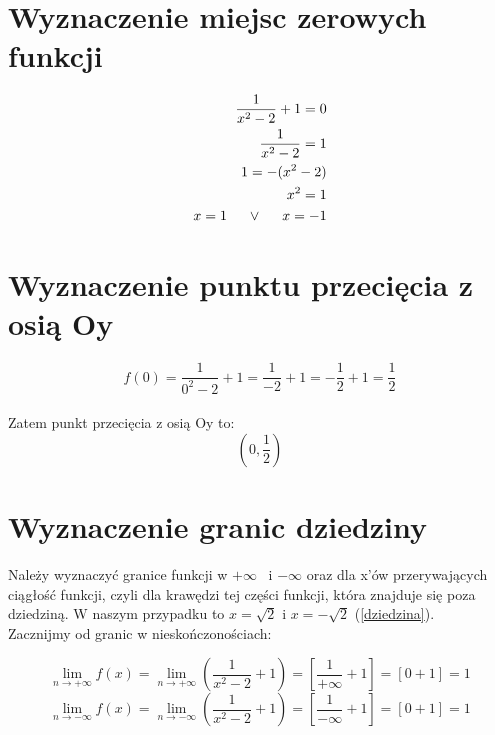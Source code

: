 \documentclass[10pt]{article}
\begin{document}
\section{Wyznaczenie miejsc zerowych funkcji}
{\large \begin{eqnarray}
\frac{1}{x^2 - 2} + 1 = 0 \\
\frac{1}{x^2 -2} = 1 \\
1 = -(x^2 -2) \\
x^2 = 1 \\
x = 1 \hspace{0.5cm} \vee \hspace{0.5cm} x = -1
\end{eqnarray}}


\section{Wyznaczenie punktu przecięcia z osią Oy}
{\large \begin{equation}
f(0) = \frac{1}{0^2 -2} + 1 = \frac{1}{-2} + 1 = -\frac{1}{2} + 1 = \frac{1}{2} 
\end{equation}}
\\ 
Zatem punkt przecięcia z osią Oy to:
{\large \begin{equation*}
\left( 0,\frac{1}{2} \right)
\end{equation*}}

\newpage

\section{Wyznaczenie granic dziedziny}
Należy wyznaczyć granice funkcji w $+\infty$ \ i $-\infty$ oraz dla x'ów przerywających ciągłość funkcji, czyli dla krawędzi tej części funkcji, która znajduje się poza dziedziną. W naszym przypadku to $x=\sqrt{2}$ i $x=- \sqrt{2}$ (\ref{dziedzina}). \\
Zacznijmy od granic w nieskończonościach:

{\large \begin{equation} \label{aspoz1}
\lim_{n \to +\infty}f(x) = \lim_{n \to +\infty} \left( \frac{1}{x^2 - 2} +1 \right) = \left[ \frac{1}{+\infty} + 1 \right] = [ 0 + 1 ] = 1
\end{equation}
\begin{equation} \label{aspoz2}
\lim_{n \to -\infty}f(x) = \lim_{n \to -\infty} \left( \frac{1}{x^2 - 2} +1 \right) = \left[ \frac{1}{-\infty} + 1 \right] = [ 0 + 1 ] = 1
\end{equation}} \\
\end{document}
